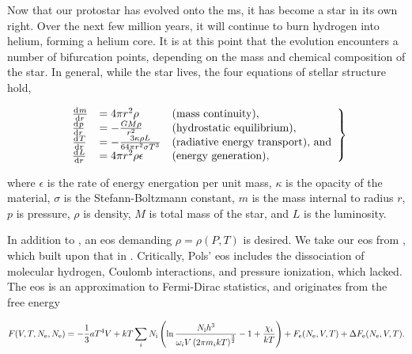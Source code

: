 
Now that our protostar has evolved onto the \gls{ms}, it has become a star in its own right. Over the next few million years, it will continue to burn hydrogen into helium, forming a helium core. It is at this point that the evolution encounters a number of bifurcation points, depending on the mass and chemical composition of the star. In general, while the star lives, the four equations of stellar structure hold,

\begin{equation}
    \left.\begin{array}{lll}
        \dv{m}{r} &= 4\pi r^2\rho & \text{(mass continuity)}, \\
        \dv{p}{r} &= -\frac{GM\rho}{r^2} & \text{(hydrostatic equilibrium)},\\
        \dv{T}{r} &= -\frac{3\kappa\rho L}{64\pi r^2\sigma T^3} & \text{(radiative energy transport), and} \\
        \dv{L}{r} &= 4\pi r^2\rho\epsilon & \text{(energy generation)},
    \end{array}\right\}
    \label{eq:stellar_structure}
\end{equation}

where $\epsilon$ is the rate of energy energation per unit mass, $\kappa$ is the opacity of the material, $\sigma$ is the Stefann-Boltzmann constant, $m$ is the mass internal to radius $r$, $p$ is pressure, $\rho$ is density, $M$ is total mass of the star, and $L$ is the luminosity.

In addition to , an \gls{eos} demanding $\rho=\rho(P, T)$ is desired. We take our \gls{eos} from \citet{Pols:1995}, which built upon that in \citet{Eggleton:1973}. Critically, Pols' \gls{eos} includes the dissociation of molecular hydrogen, Coulomb interactions, and pressure ionization, which \citet{Eggleton:1973} lacked. The \gls{eos} is an approximation to Fermi-Dirac statistics, and originates from the free energy

\begin{equation}
    F(V, T, N_\text{e}, N_\text{e}) = -\frac13 aT^4 V + kT\sum_i N_\text{i} \left(\ln\frac{N_\text{i} h^3}{\omega_i V\left(2\pi m_i kT\right)^\frac32}-1+\frac{\chi_i}{kT}\right)+F_\text{e}(N_\text{e}, V, T)+\Delta F_\text{e}(N_\text{e}, V, T).
\end{equation}


